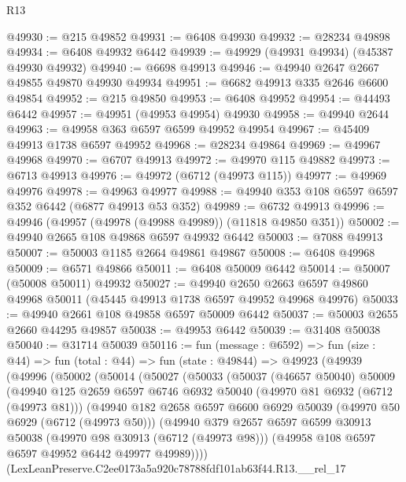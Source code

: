 \begin{lexlean}{R13}
\begin{coremodule}
@49930 := @215 @49852
@49931 := @6408 @49930
@49932 := @28234 @49898
@49934 := @6408 @49932 @6442
@49939 := @49929 (@49931 @49934) (@45387 @49930 @49932)
@49940 := @6698 @49913
@49946 := @49940 @2647 @2667 @49855 @49870 @49930 @49934
@49951 := @6682 @49913 @335 @2646 @6600 @49854
@49952 := @215 @49850
@49953 := @6408 @49952
@49954 := @44493 @6442
@49957 := @49951 (@49953 @49954) @49930
@49958 := @49940 @2644
@49963 := @49958 @363 @6597 @6599 @49952 @49954
@49967 := @45409 @49913 @1738 @6597 @49952
@49968 := @28234 @49864
@49969 := @49967 @49968
@49970 := @6707 @49913
@49972 := @49970 @115 @49882
@49973 := @6713 @49913
@49976 := @49972 (@6712 (@49973 @115))
@49977 := @49969 @49976
@49978 := @49963 @49977
@49988 := @49940 @353 @108 @6597 @6597 @352 @6442 (@6877 @49913 @53 @352)
@49989 := @6732 @49913
@49996 := @49946 (@49957 (@49978 (@49988 @49989)) (@11818 @49850 @351))
@50002 := @49940 @2665 @108 @49868 @6597 @49932 @6442
@50003 := @7088 @49913
@50007 := @50003 @1185 @2664 @49861 @49867
@50008 := @6408 @49968
@50009 := @6571 @49866
@50011 := @6408 @50009 @6442
@50014 := @50007 (@50008 @50011) @49932
@50027 := @49940
    @2650
    @2663
    @6597
    @49860
    @49968
    @50011
    (@45445 @49913 @1738 @6597 @49952 @49968 @49976)
@50033 := @49940 @2661 @108 @49858 @6597 @50009 @6442
@50037 := @50003 @2655 @2660 @44295 @49857
@50038 := @49953 @6442
@50039 := @31408 @50038
@50040 := @31714 @50039
@50116 := fun (message : @6592) =>
  fun (size : @44) =>
  fun (total : @44) =>
  fun (state : @49844) =>
  @49923
    (@49939
      (@49996
        (@50002
          (@50014
            (@50027
              (@50033
                (@50037
                  (@46657 @50040)
                  @50009
                  (@49940
                    @125
                    @2659
                    @6597
                    @6746
                    @6932
                    @50040
                    (@49970 @81 @6932 (@6712 (@49973 @81)))
                    (@49940
                      @182
                      @2658
                      @6597
                      @6600
                      @6929
                      @50039
                      (@49970 @50 @6929 (@6712 (@49973 @50)))
                      (@49940
                        @379
                        @2657
                        @6597
                        @6599
                        @30913
                        @50038
                        (@49970 @98 @30913 (@6712 (@49973 @98)))
                        (@49958 @108 @6597 @6597 @49952 @6442 @49977 @49989))))
                  (LexLeanPreserve.C2ee0173a5a920c78788fdf101ab63f44.R13.__rel_17

\end{coremodule}
\end{lexlean}
